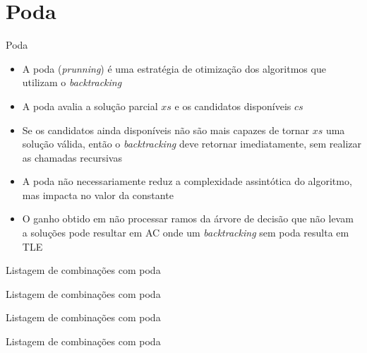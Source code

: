 \section{Poda}

\begin{frame}[fragile]{Poda}

    \begin{itemize}
        \item A poda (\textit{prunning}) é uma estratégia de otimização dos algoritmos que 
            utilizam o \textit{backtracking}

        \item A poda avalia a solução parcial $xs$ e os candidatos disponíveis $cs$

        \item Se os candidatos ainda disponíveis não são mais capazes de tornar $xs$ uma solução
            válida, então o \textit{backtracking} deve retornar imediatamente, sem realizar
            as chamadas recursivas

        \item A poda não necessariamente reduz a complexidade assintótica do algoritmo, mas 
            impacta no valor da constante 

        \item O ganho obtido em não processar ramos da árvore de decisão que não levam a
            soluções pode resultar em AC onde um \textit{backtracking} sem poda resulta em
            TLE
    \end{itemize}

\end{frame}

\begin{frame}[fragile]{Listagem de combinações com poda}
\end{frame}

\begin{frame}[fragile]{Listagem de combinações com poda}
\end{frame}

\begin{frame}[fragile]{Listagem de combinações com poda}
\end{frame}

\begin{frame}[fragile]{Listagem de combinações com poda}
\end{frame}
